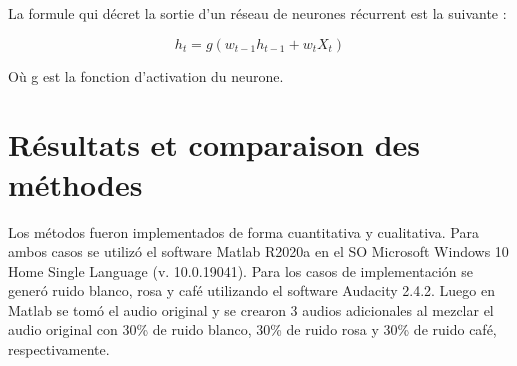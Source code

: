 \documentclass[conference,onecolumn]{IEEEtran}
\begin{document}
La formule qui décret la sortie d’un réseau de neurones récurrent est la suivante :

\begin{equation}
    h_t = g(w_{t-1}h_{t-1} + w_tX_t) 
\end{equation}


Où g est la fonction d’activation du neurone.  


\clearpage %
\section{Résultats et comparaison des méthodes}
Los métodos fueron implementados de forma cuantitativa y cualitativa. Para ambos casos se utilizó el software Matlab R2020a en el SO Microsoft Windows 10 Home Single Language (v. 10.0.19041). Para los casos de implementación se generó ruido blanco, rosa y café utilizando el software Audacity 2.4.2. Luego en Matlab se tomó el audio original y se crearon 3 audios adicionales al mezclar el audio original con 30\% de ruido blanco, 30\% de ruido rosa y 30\% de ruido café, respectivamente.
\end{document}
